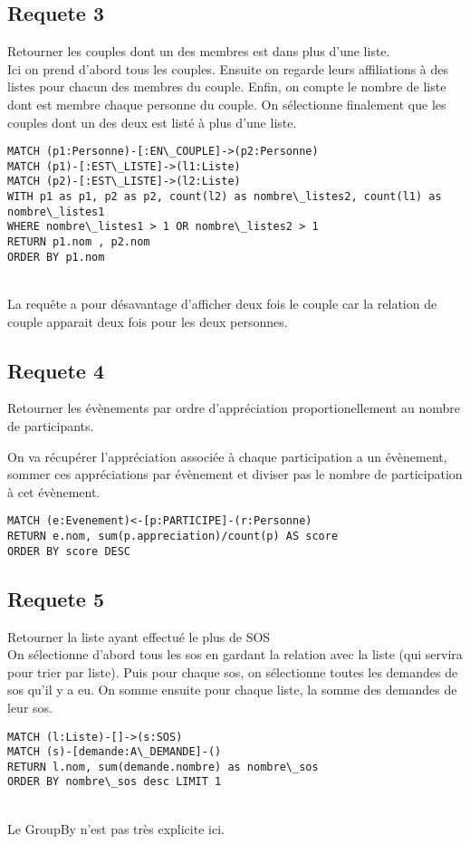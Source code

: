 \documentclass[a4paper,oneside,1pt]{article}
\begin{document}
\subsection{Requete 3}
Retourner les couples dont un des membres est dans plus d'une liste.
\\
Ici on prend d'abord tous les couples. Ensuite on regarde leurs affiliations à des listes pour chacun des membres du couple. Enfin, on compte le nombre de liste dont est membre chaque personne du couple. On sélectionne finalement que les couples dont un des deux est listé à plus d'une liste.
\\
\begin{verbatim}
MATCH (p1:Personne)-[:EN\_COUPLE]->(p2:Personne)
MATCH (p1)-[:EST\_LISTE]->(l1:Liste)
MATCH (p2)-[:EST\_LISTE]->(l2:Liste)
WITH p1 as p1, p2 as p2, count(l2) as nombre\_listes2, count(l1) as nombre\_listes1
WHERE nombre\_listes1 > 1 OR nombre\_listes2 > 1 
RETURN p1.nom , p2.nom
ORDER BY p1.nom
\end{verbatim}
\\
La requête a pour désavantage d'afficher deux fois le couple car la relation de couple apparait deux fois pour les deux personnes.

\subsection{Requete 4}
Retourner les évènements par ordre d'appréciation proportionellement au nombre de participants.

On va récupérer l'appréciation associée à chaque participation a un évènement, sommer ces appréciations par évènement et diviser pas le nombre de participation à cet évènement.
\begin{verbatim}
MATCH (e:Evenement)<-[p:PARTICIPE]-(r:Personne)
RETURN e.nom, sum(p.appreciation)/count(p) AS score
ORDER BY score DESC
\end{verbatim}

\subsection{Requete 5}
Retourner la liste ayant effectué le plus de SOS
\\
On sélectionne d'abord tous les sos en gardant la relation avec la liste (qui servira pour trier par liste). Puis pour chaque sos, on sélectionne toutes les demandes de sos qu'il y a eu. On somme ensuite pour chaque liste, la somme des demandes de leur sos.
\\
\begin{verbatim}
MATCH (l:Liste)-[]->(s:SOS)
MATCH (s)-[demande:A\_DEMANDE]-()
RETURN l.nom, sum(demande.nombre) as nombre\_sos
ORDER BY nombre\_sos desc LIMIT 1
\end{verbatim}
\\ 
Le GroupBy n'est pas très explicite ici.
\end{document}

